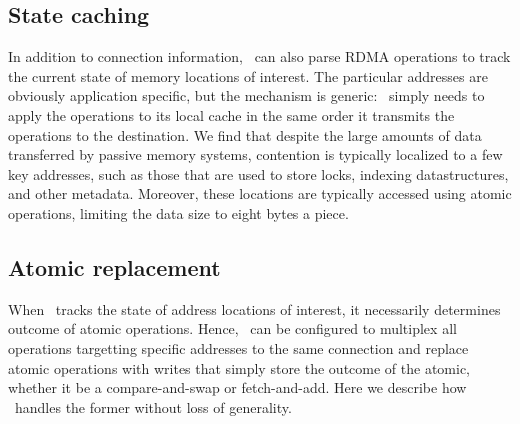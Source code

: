 \subsection{State caching}

In addition to connection information, \sword\ can also parse RDMA
operations to track the current state of memory locations of interest.
The particular addresses are obviously application specific, but the
mechanism is generic: \sword\ simply needs to apply the operations to
its local cache in the same order it transmits the operations to the
destination.  We find that despite the large amounts of data
transferred by passive memory systems, contention is typically
localized to a few key addresses, such as those that are used to store
locks, indexing datastructures, and other metadata.  Moreover, these
locations are typically accessed using atomic operations, limiting
the data size to eight bytes a piece.





\subsection{Atomic replacement}
\label{ss:rewrite}

When \sword\ tracks the state of address locations of interest, it
necessarily determines outcome of atomic operations.  Hence,
\sword\ can be configured to multiplex all operations targetting
specific addresses to the same connection and replace atomic
operations with writes that simply store the outcome of the atomic,
whether it be a compare-and-swap or fetch-and-add.  Here we describe
how \sword\ handles the former without loss of generality.

